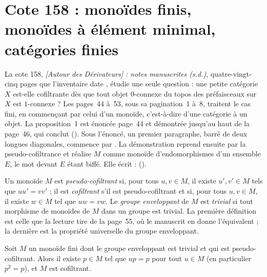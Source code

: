 \section[Cote 158 : monoïdes finis, monoïdes à élément minimal, catégories finies]{Cote 158 : monoïdes finis, monoïdes à élément minimal, catégories finies\protect{}}\label{sec:158}

La cote 158, \emph{[Autour des Dérivateurs] : notes manuscrites (s.d.)}, quatre-vingt-cinq pages que l'inventaire date \q{[vers 1990-1991]}, étudie une seule question : une petite catégorie $X$ est-elle cofiltrante dès que tout objet $0$-connexe du topos des préfaisceaux sur $X$ est $1$-connexe ? Les pages~44 à~53, sous sa pagination~1 à~8, traitent le cas fini, en commençant par celui d'un monoïde, c'est-à-dire d'une catégorie à un objet. La proposition~1 est énoncée page~44 et démontrée jusqu'au haut de la page~46, qui conclut  (). Sous l'énoncé, un premier paragraphe, barré de deux longues diagonales, commence par . La démonstration reprend ensuite par la pseudo-cofiltrance et réalise $M$ comme monoïde d'endomorphismes d'un ensemble $E$, le mot  devant $E$ étant biffé. Elle écrit :  ().

\begin{definition}
Un monoïde $M$ est \emph{pseudo-cofiltrant} si, pour tous $u, v \in M$, il existe $u', v' \in M$ tels que $uu' = vv'$ ; il est \emph{cofiltrant} s'il est pseudo-cofiltrant et si, pour tous $u, v \in M$, il existe $w \in M$ tel que $uw = vw$. Le \emph{groupe enveloppant} de $M$ est \emph{trivial} si tout morphisme de monoïdes de $M$ dans un groupe est trivial. La première définition est celle que la lecture tire de la page~55, où le manuscrit en donne l'équivalent ; la dernière est la propriété universelle du groupe enveloppant.
\end{definition}

\begin{encadre}
\begin{theoreme}
Soit $M$ un monoïde fini dont le groupe enveloppant est trivial et qui est pseudo-cofiltrant. Alors il existe $p \in M$ tel que $up = p$ pour tout $u \in M$ (en particulier $p^2 = p$), et $M$ est cofiltrant.
\end{theoreme}
\end{encadre}

